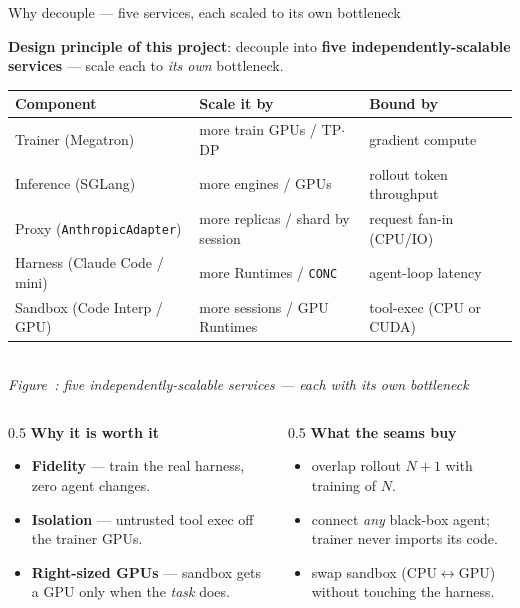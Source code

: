 \documentclass[aspectratio=169]{beamer}
\newcounter{deckfig}
\newcommand{\figtag}[1]{\refstepcounter{deckfig}%
  {\scriptsize\itshape Figure~\thedeckfig: #1}}
\begin{document}
\begin{frame}{Why decouple --- five services, each scaled to its own bottleneck}
  \begin{center}\vspace{-0.5em}
  {\small\alert{\textbf{Design principle of this project}}: decouple into \textbf{five
  independently-scalable services} --- scale each to \emph{its own} bottleneck.}
  \end{center}
  \vspace{-0.3em}
  \begin{center}
  \renewcommand{\arraystretch}{1.0}\scriptsize
  \begin{tabular}{lll}
    \toprule
    \textbf{Component} & \textbf{Scale it by} & \textbf{Bound by} \\
    \midrule
    Trainer (Megatron)        & more train GPUs / TP$\cdot$DP      & gradient compute \\
    Inference (SGLang)        & more engines / GPUs                & rollout token throughput \\
    Proxy (\texttt{AnthropicAdapter}) & more replicas / shard by session & request fan-in (CPU/IO) \\
    Harness (Claude Code / mini)     & more Runtimes / \texttt{CONC} & agent-loop latency \\
    Sandbox (Code Interp / GPU)      & more sessions / GPU Runtimes & tool-exec (CPU or CUDA) \\
    \bottomrule
  \end{tabular}
  \\[0.1em]\figtag{five independently-scalable services --- each with its own bottleneck}
  \end{center}
  \vspace{-0.4em}
  \begin{columns}[T]
    \begin{column}{0.5\textwidth}
      \textbf{Why it is worth it}
      \begin{itemize}\setlength\itemsep{0.1em}
        \item \textbf{Fidelity} --- train the real harness, zero agent changes.
        \item \textbf{Isolation} --- untrusted tool exec off the trainer GPUs.
        \item \textbf{Right-sized GPUs} --- sandbox gets a GPU only when the \emph{task} does.
      \end{itemize}
    \end{column}
    \begin{column}{0.5\textwidth}
      \textbf{What the seams buy}
      \begin{itemize}\setlength\itemsep{0.1em}
        \item {} overlap rollout $N{+}1$ with training of $N$.
        \item {} connect \emph{any} black-box agent; trainer never imports its code.
        \item {} swap sandbox (CPU$\leftrightarrow$GPU) without touching the harness.
      \end{itemize}
    \end{column}
  \end{columns}
\end{frame}
\end{document}
